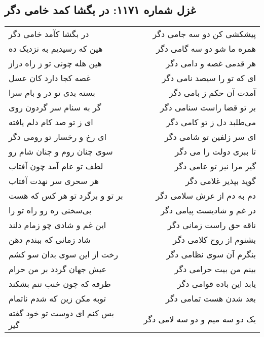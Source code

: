 \begin{center}
\section*{غزل شماره ۱۱۷۱: در بگشا کمد خامی دگر}
\label{sec:1171}
\begin{longtable}{l p{0.5cm} r}
در بگشا کآمد خامی دگر
&&
پیشکشی کن دو سه جامی دگر
\\
هین که رسیدیم به نزدیک ده
&&
همره ما شو دو سه گامی دگر
\\
هین هله چونی تو ز راه دراز
&&
هر قدمی غصه و دامی دگر
\\
غصه کجا دارد کان عسل
&&
ای که تو را سیصد نامی دگر
\\
بسته بدی تو در و بام سرا
&&
آمدت آن حکم ز بامی دگر
\\
گر به سنام سر گردون روی
&&
بر تو قضا راست سنامی دگر
\\
ای ز تو صد کام دلم یافته
&&
می‌طلبد دل ز تو کامی دگر
\\
ای رخ و رخسار تو رومی دگر
&&
ای سر زلفین تو شامی دگر
\\
سوی چنان روم و چنان شام رو
&&
تا ببری دولت را می دگر
\\
لطف تو عام آمد چون آفتاب
&&
گیر مرا نیز تو عامی دگر
\\
هر سحری سر نهدت آفتاب
&&
گوید بپذیر غلامی دگر
\\
بر تو و برگرد تو هر کس که هست
&&
دم به دم از عرش سلامی دگر
\\
بی‌سخنی ره رو راه تو را
&&
در غم و شادیست پیامی دگر
\\
این غم و شادی چو زمام دلند
&&
ناقه حق راست زمانی دگر
\\
شاد زمانی که ببندم دهن
&&
بشنوم از روح کلامی دگر
\\
رخت از این سوی بدان سو کشم
&&
بنگرم آن سوی نظامی دگر
\\
عیش جهان گردد بر من حرام
&&
بینم من بیت حرامی دگر
\\
طرفه که چون خنب تنم بشکند
&&
یابد این باده قوامی دگر
\\
توبه مکن زین که شدم ناتمام
&&
بعد شدن هست تمامی دگر
\\
بس کنم ای دوست تو خود گفته گیر
&&
یک دو سه میم و دو سه لامی دگر
\\
\end{longtable}
\end{center}
